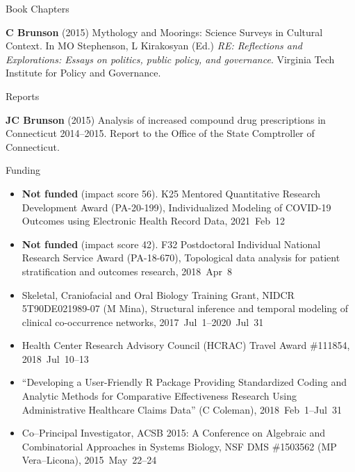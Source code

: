 \documentclass[10pt,a4paper]{article}
\begin{document}
%
\vspace{.25cm}
{\sc Book Chapters}
\begin{enumerate}[label={[\arabic*]},labelindent=1cm,nolistsep]
\item
{\bfseries C Brunson} (2015) Mythology and Moorings: Science Surveys in Cultural Context. In MO Stephenson, L Kirakosyan (Ed.) {\itshape RE: Reflections and Explorations: Essays on politics, public policy, and governance}. Virginia Tech Institute for Policy and Governance.
\setcounter{paper}{\value{enumi}}
\end{enumerate}
%
\vspace{.25cm}
{\sc Reports}
\begin{enumerate}[label={[\arabic*]},labelindent=1cm,nolistsep]
\item
{\bfseries JC Brunson} (2015) Analysis of increased compound drug prescriptions in Connecticut 2014--2015. Report to the Office of the State Comptroller of Connecticut.
\setcounter{paper}{\value{enumi}}
\end{enumerate}


\vspace{.25cm}
{\sc Funding}
\begin{itemize}[label=$\circ$,nolistsep]
\item
{\bfseries Not funded} (impact score 56). K25 Mentored Quantitative Research Development Award (PA-20-199), Individualized Modeling of COVID-19 Outcomes using Electronic Health Record Data, 2021~Feb~12
\item
{\bfseries Not funded} (impact score 42). F32 Postdoctoral Individual National Research Service Award (PA-18-670), Topological data analysis for patient stratification and outcomes
research, 2018~Apr~8
\item
Skeletal, Craniofacial and Oral Biology Training Grant, NIDCR 5T90DE021989-07 (M Mina), Structural inference and temporal modeling of clinical co-occurrence networks, 2017~Jul~1--2020~Jul~31
\item
Health Center Research Advisory Council (HCRAC) Travel Award \#111854, 2018~Jul~10--13
\item
``Developing a User-Friendly R Package Providing Standardized Coding and Analytic Methods for Comparative Effectiveness Research Using Administrative Healthcare Claims Data'' (C Coleman), 2018~Feb~1--Jul~31
\item
Co--Principal Investigator, ACSB 2015: A Conference on Algebraic and Combinatorial Approaches in Systems Biology, NSF DMS \#1503562 (MP Vera--Licona), 2015~May~22--24
\end{itemize}
\end{document}
